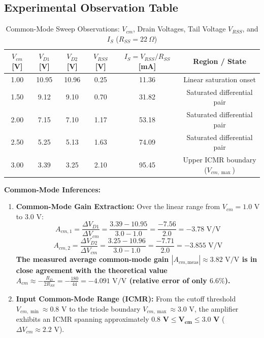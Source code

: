 \documentclass[11pt,a4paper]{article}
\begin{document}
\subsection{Experimental Observation Table}
\begin{table}[H]
\centering
\caption{Common-Mode Sweep Observations: $V_{cm}$, Drain Voltages, Tail Voltage $V_{RSS}$, and $I_{S}$ ($R_{SS} = 22\ \Omega$)}
\label{tab:sheet2}
\begin{tabular}{@{}cccccc@{}}
\toprule
\textbf{$V_{cm}$ [V]} & \textbf{$V_{D1}$ [V]} & \textbf{$V_{D2}$ [V]} & \textbf{$V_{RSS}$ [V]} & \textbf{$I_{S} = V_{RSS}/R_{SS}$ [mA]} & \textbf{Region / State} \\ \midrule
1.00 & 10.95 & 10.96 & 0.25 & 11.36 & Linear saturation onset \\
1.50 & 9.12 & 9.10 & 0.70 & 31.82 & Saturated differential pair \\
2.00 & 7.15 & 7.10 & 1.17 & 53.18 & Saturated differential pair \\
2.50 & 5.25 & 5.13 & 1.63 & 74.09 & Saturated differential pair \\
3.00 & 3.39 & 3.25 & 2.10 & 95.45 & Upper ICMR boundary ($V_{cm,\max}$) \\
\bottomrule
\end{tabular}
\end{table}

\noindent\textbf{Common-Mode Inferences:}
\begin{enumerate}
    \item \textbf{Common-Mode Gain Extraction:} Over the linear range from $V_{cm} = 1.0\text{ V}$ to $3.0\text{ V}$:
    \begin{equation}
        A_{cm,1} = \frac{\Delta V_{D1}}{\Delta V_{cm}} = \frac{3.39 - 10.95}{3.0 - 1.0} = \frac{-7.56}{2.0} = -3.78\text{ V/V}
    \end{equation}
    \begin{equation}
        A_{cm,2} = \frac{\Delta V_{D2}}{\Delta V_{cm}} = \frac{3.25 - 10.96}{3.0 - 1.0} = \frac{-7.71}{2.0} = -3.855\text{ V/V}
    \end{equation}
    \textbf{The measured average common-mode gain $|A_{cm,\text{meas}}| \approx 3.82\text{ V/V}$ is in close agreement with the theoretical value $A_{cm} \approx -\frac{R_D}{2 R_{SS}} = -\frac{180}{44} = -4.091\text{ V/V}$ (relative error of only $6.6\%$).}
    \item \textbf{Input Common-Mode Range (ICMR):} From the cutoff threshold $V_{cm,\min} \approx 0.8\text{ V}$ to the triode boundary $V_{cm,\max} \approx 3.0\text{ V}$, the amplifier exhibits an ICMR spanning approximately $\mathbf{0.8\text{ V} \le V_{cm} \le 3.0\text{ V}}$ ($\Delta V_{cm} \approx 2.2\text{ V}$).
\end{enumerate}
\end{document}
